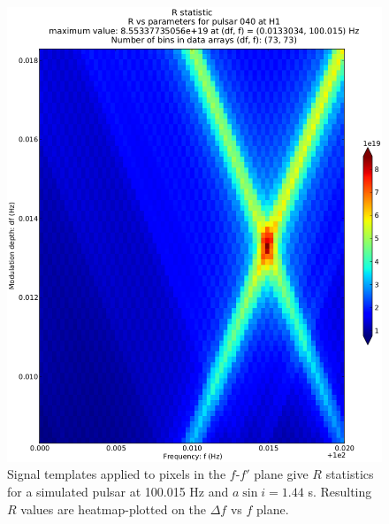 \begin{figure}
\begin{center}
\includegraphics[trim=20 20 20 80, clip, keepaspectratio,height=0.55\paperheight]{plots/R-4e21-on-4e24.eps}
\caption{Signal templates applied to pixels in the $f$-$f'$ plane give $R$ statistics for a simulated pulsar 
at 100.015 Hz and $a \sin i = 1.44$ s. Resulting $R$ values are heatmap-plotted on the $\Delta f$ vs $f$ plane.}
\label{inj_R_statistic}
\end{center}
\end{figure}

